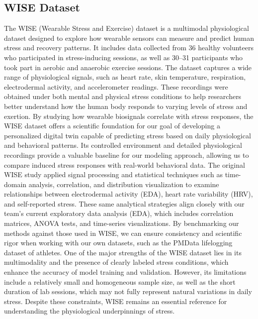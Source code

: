 \documentclass[12pt,letterpaper]{article}
\begin{document}
\subsection{WISE Dataset}
The WISE (Wearable Stress and Exercise) dataset is a multimodal physiological dataset designed to explore how wearable sensors can measure and predict human stress and recovery patterns. It includes data collected from 36 healthy volunteers who participated in stress-inducing sessions, as well as 30–31 participants who took part in aerobic and anaerobic exercise sessions. The dataset captures a wide range of physiological signals, such as heart rate, skin temperature, respiration, electrodermal activity, and accelerometer readings. These recordings were obtained under both mental and physical stress conditions to help researchers better understand how the human body responds to varying levels of stress and exertion. By studying how wearable biosignals correlate with stress responses, the WISE dataset offers a scientific foundation for our goal of developing a personalized digital twin capable of predicting stress based on daily physiological and behavioral patterns. Its controlled environment and detailed physiological recordings provide a valuable baseline for our modeling approach, allowing us to compare induced stress responses with real-world behavioral data. The original WISE study applied signal processing and statistical techniques such as time-domain analysis, correlation, and distribution visualization to examine relationships between electrodermal activity (EDA), heart rate variability (HRV), and self-reported stress. These same analytical strategies align closely with our team’s current exploratory data analysis (EDA), which includes correlation matrices, ANOVA tests, and time-series visualizations. By benchmarking our methods against those used in WISE, we can ensure consistency and scientific rigor when working with our own datasets, such as the PMData lifelogging dataset of athletes. One of the major strengths of the WISE dataset lies in its multimodality and the presence of clearly labeled stress conditions, which enhance the accuracy of model training and validation. However, its limitations include a relatively small and homogeneous sample size, as well as the short duration of lab sessions, which may not fully represent natural variations in daily stress. Despite these constraints, WISE remains an essential reference for understanding the physiological underpinnings of stress.
\end{document}
